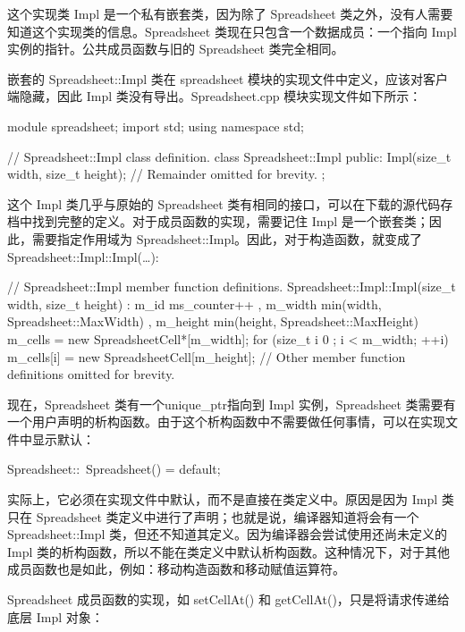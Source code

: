 这个实现类 Impl 是一个私有嵌套类，因为除了 Spreadsheet 类之外，没有人需要知道这个实现类的信息。Spreadsheet 类现在只包含一个数据成员：一个指向 Impl 实例的指针。公共成员函数与旧的 Spreadsheet 类完全相同。

嵌套的 Spreadsheet::Impl 类在 spreadsheet 模块的实现文件中定义，应该对客户端隐藏，因此 Impl 类没有导出。Spreadsheet.cpp 模块实现文件如下所示：

\begin{cpp}
module spreadsheet;
import std;
using namespace std;

// Spreadsheet::Impl class definition.
class Spreadsheet::Impl
{
    public:
        Impl(size_t width, size_t height);
        // Remainder omitted for brevity.
};
\end{cpp}

这个 Impl 类几乎与原始的 Spreadsheet 类有相同的接口，可以在下载的源代码存档中找到完整的定义。对于成员函数的实现，需要记住 Impl 是一个嵌套类；因此，需要指定作用域为 Spreadsheet::Impl。因此，对于构造函数，就变成了 Spreadsheet::Impl::Impl(…):

\begin{cpp}
// Spreadsheet::Impl member function definitions.
Spreadsheet::Impl::Impl(size_t width, size_t height)
    : m_id { ms_counter++ }
    , m_width { min(width, Spreadsheet::MaxWidth) }
    , m_height { min(height, Spreadsheet::MaxHeight) }
{
    m_cells = new SpreadsheetCell*[m_width];
    for (size_t i { 0 }; i < m_width; ++i) {
        m_cells[i] = new SpreadsheetCell[m_height];
    }
}
// Other member function definitions omitted for brevity.
\end{cpp}

现在，Spreadsheet 类有一个unique\_ptr指向到 Impl 实例，Spreadsheet 类需要有一个用户声明的析构函数。由于这个析构函数中不需要做任何事情，可以在实现文件中显示默认：

\begin{cpp}
Spreadsheet::~Spreadsheet() = default;
\end{cpp}

实际上，它必须在实现文件中默认，而不是直接在类定义中。原因是因为 Impl 类只在 Spreadsheet 类定义中进行了声明；也就是说，编译器知道将会有一个 Spreadsheet::Impl 类，但还不知道其定义。因为编译器会尝试使用还尚未定义的 Impl 类的析构函数，所以不能在类定义中默认析构函数。这种情况下，对于其他成员函数也是如此，例如：移动构造函数和移动赋值运算符。

Spreadsheet 成员函数的实现，如 setCellAt() 和 getCellAt()，只是将请求传递给底层 Impl 对象：

